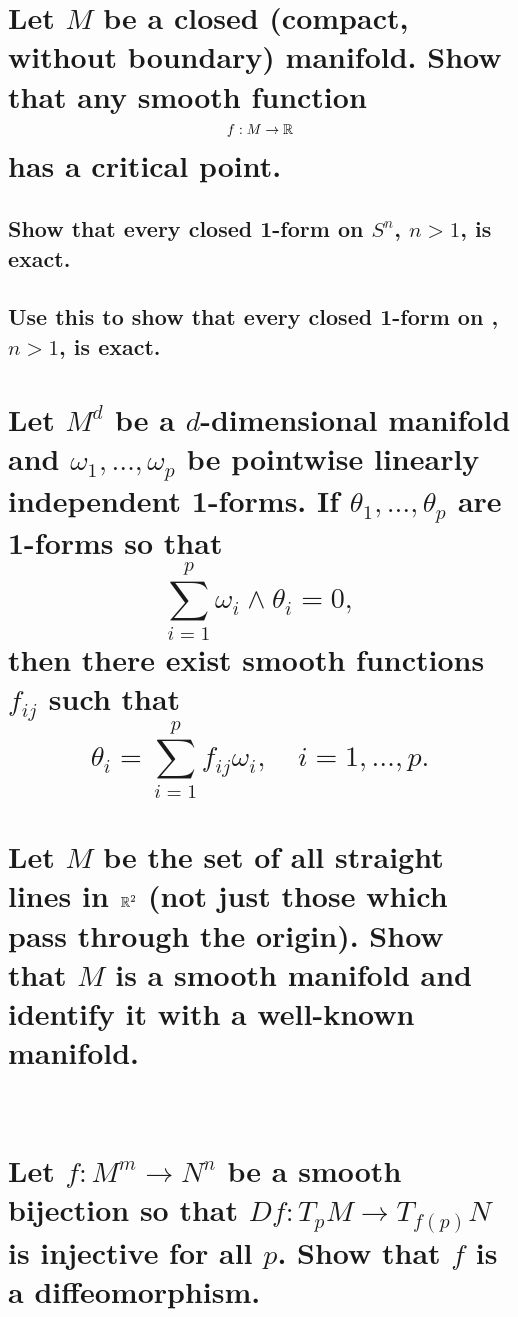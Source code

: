\documentclass[10pt]{article}
\begin{document}
 

\section{Let $M$ be a closed (compact, without boundary) manifold. Show that any
  smooth function $$f: M \to \mathbb{R} $$ has a critical point.}

\advsection{}

\subsection{Show that every closed 1-form on $S^n$, $n>1$, is exact.}

\subsection{Use this to show that every closed 1-form on , $n>1$, is exact.}

\section{Let $M^d$ be a $d$-dimensional manifold and $\omega_1, \dots, \omega_p$
  be pointwise linearly independent 1-forms. If $\theta_1, \dots, \theta_p$ are
  1-forms so that 
$$\sum_{i=1}^p \omega_i \wedge \theta_i =0,$$
then there exist smooth functions $f_{ij}$ such that $$\theta_i = \sum_{i=1}^p f_{ij} \omega_i,
\quad i=1, \dots, p.$$ }

\section{Let $M$ be the set of all straight lines in $\mathbb{R}^2$ (not just those which pass
  through the origin). Show that $M$ is a smooth manifold and identify it with a well-known
  manifold.  \\\\ }

\section{Let $f: M^m \to N^n$ be a smooth bijection so that $Df: T_p M \to T_{f(p)}N$ is injective
  for all $p$. Show that $f$ is a diffeomorphism.}

\advsection{}
\end{document}
